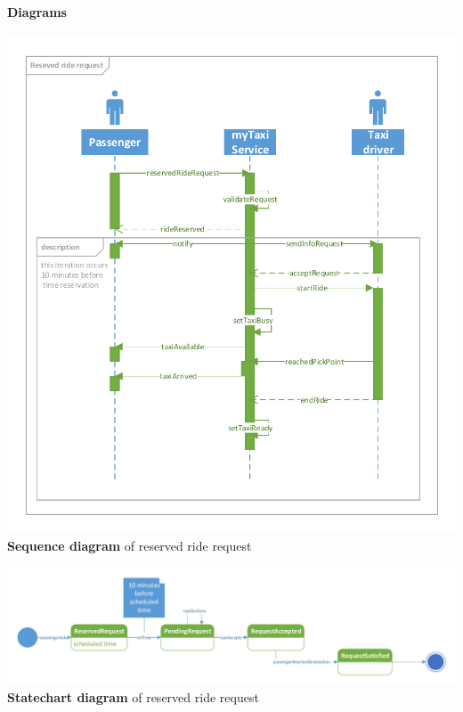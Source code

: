 	\paragraph{Diagrams}
		\begin{center}
	\includegraphics[width=\textwidth]{diagrams/reserved_request}
	\textbf{Sequence diagram} of reserved ride request
\end{center}
\begin{center}
	\includegraphics[width=\textwidth]{diagrams/reserved_state}
	\textbf{Statechart diagram} of reserved ride request
\end{center}

